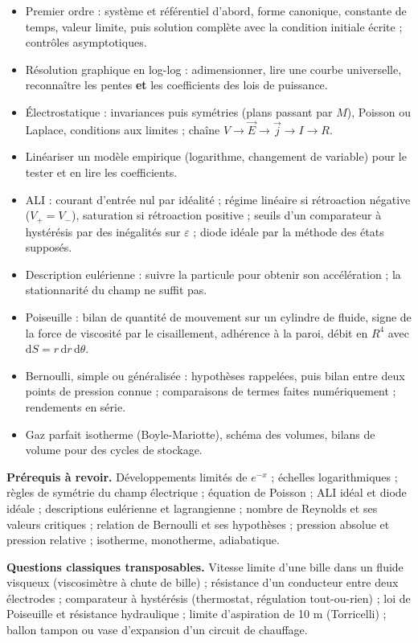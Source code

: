 \documentclass[11pt,a4paper]{article}
\providecommand{\tightlist}{\setlength{\itemsep}{0pt}\setlength{\parskip}{0pt}}
\begin{document}
\begin{itemize}
\tightlist
\item
  Premier ordre : système et référentiel d'abord, forme canonique, constante de temps, valeur limite, puis solution complète avec la condition initiale écrite ; contrôles asymptotiques.
\item
  Résolution graphique en log-log : adimensionner, lire une courbe universelle, reconnaître les pentes \textbf{et} les coefficients des lois de puissance.
\item
  Électrostatique : invariances puis symétries (plans passant par \(M\)), Poisson ou Laplace, conditions aux limites ; chaîne \(V\to\vec E\to\vec j\to I\to R\).
\item
  Linéariser un modèle empirique (logarithme, changement de variable) pour le tester et en lire les coefficients.
\item
  ALI : courant d'entrée nul par idéalité ; régime linéaire si rétroaction négative (\(V_+=V_-\)), saturation si rétroaction positive ; seuils d'un comparateur à hystérésis par des inégalités sur \(\varepsilon\) ; diode idéale par la méthode des états supposés.
\item
  Description eulérienne : suivre la particule pour obtenir son accélération ; la stationnarité du champ ne suffit pas.
\item
  Poiseuille : bilan de quantité de mouvement sur un cylindre de fluide, signe de la force de viscosité par le cisaillement, adhérence à la paroi, débit en \(R^4\) avec \(\mathrm dS=r\,\mathrm dr\,\mathrm d\theta\).
\item
  Bernoulli, simple ou généralisée : hypothèses rappelées, puis bilan entre deux points de pression connue ; comparaisons de termes faites numériquement ; rendements en série.
\item
  Gaz parfait isotherme (Boyle-Mariotte), schéma des volumes, bilans de volume pour des cycles de stockage.
\end{itemize}

\textbf{Prérequis à revoir.} Développements limités de \(e^{-x}\) ; échelles logarithmiques ; règles de symétrie du champ électrique ; équation de Poisson ; ALI idéal et diode idéale ; descriptions eulérienne et lagrangienne ; nombre de Reynolds et ses valeurs critiques ; relation de Bernoulli et ses hypothèses ; pression absolue et pression relative ; isotherme, monotherme, adiabatique.

\textbf{Questions classiques transposables.} Vitesse limite d'une bille dans un fluide visqueux (viscosimètre à chute de bille) ; résistance d'un conducteur entre deux électrodes ; comparateur à hystérésis (thermostat, régulation tout-ou-rien) ; loi de Poiseuille et résistance hydraulique ; limite d'aspiration de 10 m (Torricelli) ; ballon tampon ou vase d'expansion d'un circuit de chauffage.
\end{document}
